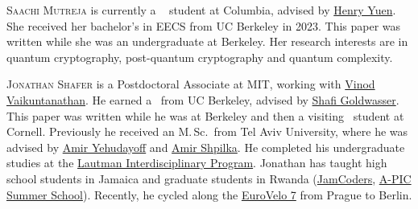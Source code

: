 \documentclass{toc}
\begin{document}
%
%
%
%
%
%
%
%
%
%
%
%
%
%
%
%
%
%
%
%
\begin{tocaboutauthors}
\begin{tocabout}[mutreja]  %
\textsc{Saachi Mutreja} is currently a %
%
\phd\  %
student at Columbia,
advised by \href{https://www.henryyuen.net}{Henry Yuen}.
She received her bachelor's in EECS from UC Berkeley
in 2023.  %
This paper was written while she was an undergraduate at Berkeley. %
Her research interests are in quantum cryptography, post-quantum cryptography
and quantum complexity.
%
%
%
%
%
%
%
%
%
%
%


\end{tocabout}
\begin{tocabout}[shafer]
\textsc{Jonathan Shafer} is a Postdoctoral Associate at MIT, working
with \href{https://people.csail.mit.edu/vinodv/}{Vinod
  Vaikuntanathan}. He earned a \phd\ from UC Berkeley, advised by
\href{https://www2.eecs.berkeley.edu/Faculty/Homepages/goldwasser.html}{Shafi
  Goldwasser}.
%
This paper was written while he was at Berkeley and then a visiting
\phd\ student at Cornell.  
%
Previously he received  %
 an M.\,Sc.\ from Tel Aviv University, where
he was advised by \href{https://amiryehudayoff.github.io/home/}{Amir
  Yehudayoff} and \href{https://www.cs.tau.ac.il/~shpilka/}{Amir
  Shpilka}. He completed his undergraduate studies at the
\href{https://en.wikipedia.org/wiki/Adi_Lautman_Interdisciplinary_Program_for_Outstanding_Students}{Lautman
  Interdisciplinary Program}. Jonathan has taught high school students
in Jamaica and graduate students in Rwanda
(\href{https://jamcoders.org.jm/}{JamCoders},
\href{https://archive.is/4dBGg}{A-PIC Summer School}). Recently, he
cycled along the
\href{https://en.wikipedia.org/wiki/EV7_The_Sun_Route}{EuroVelo 7}
from Prague to Berlin.
\end{tocabout}
\end{tocaboutauthors}
\end{document}
